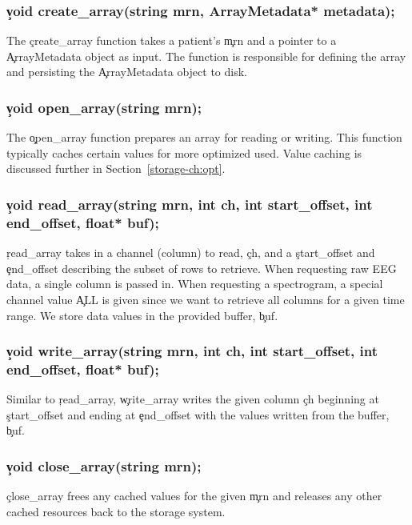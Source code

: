 \subsubsection{\c{void create\_array(string mrn, ArrayMetadata* metadata);}}

The \c{create\_array} function takes a patient's \c{mrn} and a pointer to a
\c{ArrayMetadata} object as input. The function is responsible for defining the
array and persisting the \c{ArrayMetadata} object to disk.

\subsubsection{\c{void open\_array(string mrn);}}

The \c{open\_array} function prepares an array for reading or writing. This
function typically caches certain values for more optimized used. Value caching is
discussed further in Section~\ref{storage-ch:opt}.

\subsubsection{\c{void read\_array(string mrn, int ch, int start\_offset, int end\_offset, float* buf);}}

\c{read\_array} takes in a channel (column) to read, \c{ch}, and a
\c{start\_offset} and \c{end\_offset} describing the subset of rows to
retrieve. When requesting raw EEG data, a single column is passed in. When
requesting a spectrogram, a special channel value \c{ALL} is given since we
want to retrieve all columns for a given time range. We store data values in
the provided buffer, \c{buf}.

\subsubsection{\c{void write\_array(string mrn, int ch, int start\_offset, int end\_offset, float* buf);}}

Similar to \c{read\_array}, \c{write\_array} writes the given column \c{ch}
beginning at \c{start\_offset} and ending at \c{end\_offset} with the values
written from the buffer, \c{buf}.

\subsubsection{\c{void close\_array(string mrn);}}

\c{close\_array} frees any cached values for the given \c{mrn} and releases any
other cached resources back to the storage system.

